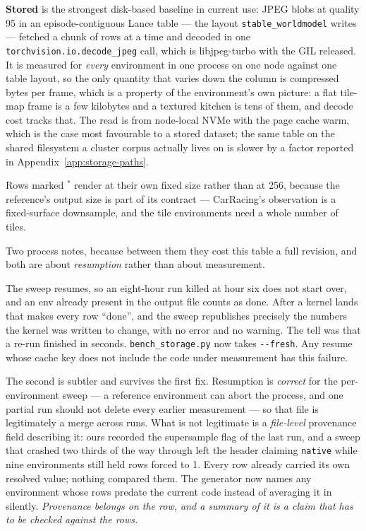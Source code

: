 \documentclass{article}
\begin{document}
\textbf{Stored} is the strongest disk-based baseline in current use: JPEG blobs
at quality 95 in an episode-contiguous Lance table --- the layout
\texttt{stable\_worldmodel} writes --- fetched a chunk of rows at a time and
decoded in one \texttt{torchvision.io.decode\_jpeg} call, which is
libjpeg-turbo with the GIL released. It is measured for \emph{every}
environment in one process on one node against one table layout, so the only
quantity that varies down the column is compressed bytes per frame, which is a
property of the environment's own picture: a flat tile-map frame is a few
kilobytes and a textured kitchen is tens of them, and decode cost tracks that.
The read is from node-local NVMe with the page cache warm, which is the case
most favourable to a stored dataset; the same table on the shared filesystem a
cluster corpus actually lives on is slower by a factor reported in
Appendix~\ref{app:storage-paths}.

Rows marked $^{*}$ render at their own fixed size rather than at 256, because
the reference's output size is part of its contract --- CarRacing's observation
is a fixed-surface downsample, and the tile environments need a whole number of
tiles.

Two process notes, because between them they cost this table a full revision,
and both are about \emph{resumption} rather than about measurement.

The sweep resumes, so an eight-hour run killed at hour six does not start over,
and an env already present in the output file counts as done. After a kernel
lands that makes every row ``done'', and the sweep republishes precisely the
numbers the kernel was written to change, with no error and no warning. The
tell was that a re-run finished in seconds. \texttt{bench\_storage.py} now
takes \texttt{-{-}fresh}. Any resume whose cache key does not include the code
under measurement has this failure.

The second is subtler and survives the first fix. Resumption is
\emph{correct} for the per-environment sweep --- a reference environment can
abort the process, and one partial run should not delete every earlier
measurement --- so that file is legitimately a merge across runs. What is not
legitimate is a \emph{file-level} provenance field describing it: ours recorded
the supersample flag of the last run, and a sweep that crashed two thirds of the
way through left the header claiming \texttt{native} while nine environments
still held rows forced to 1. Every row already carried its own resolved value;
nothing compared them. The generator now names any environment whose rows
predate the current code instead of averaging it in silently. \emph{Provenance
belongs on the row, and a summary of it is a claim that has to be checked
against the rows.}
\end{document}
